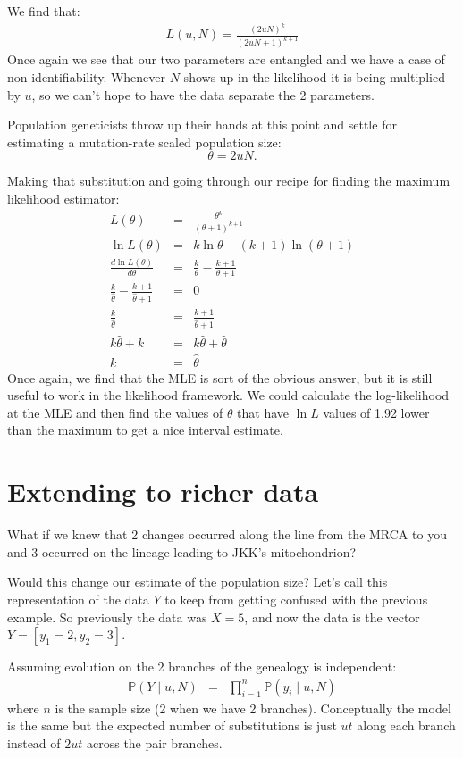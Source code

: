 \documentclass[11pt]{article}
\renewcommand{\Pr}{\mathbb{P}}
\begin{document}
We find that:
\begin{eqnarray}
L(u, N)  = \frac{(2uN)^k}{(2uN + 1)^{k+1}} \label{simplestL}
\end{eqnarray}
Once again we see that our two parameters are entangled and we have a case of non-identifiability.
Whenever $N$ shows up in the likelihood it is being multiplied by $u$, so we can't hope to 
have the data separate the 2 parameters.

Population geneticists throw up their hands at this point and settle for estimating a mutation-rate scaled population size:
$$\theta = 2uN.$$

Making that substitution and going through our recipe for finding the maximum likelihood estimator:
\begin{eqnarray}
L(\theta)  & = & \frac{\theta^k}{(\theta + 1)^{k+1}} \\
\ln L(\theta)  & = & k\ln\theta - (k+1) \ln(\theta + 1) \\
\frac{d\ln L(\theta)}{d\theta} & = & \frac{k}{\theta} - \frac{k + 1}{\theta + 1} \\
\frac{k}{\hat{\theta}} - \frac{k + 1}{\hat{\theta} + 1} & = & 0 \\ 
\frac{k}{\hat{\theta}} & = &  \frac{k + 1}{\hat{\theta} + 1} \\
k\hat{\theta} + k & = & k\hat{\theta} + \hat{\theta} \\
k & = & \hat{\theta}
\end{eqnarray}
Once again, we find that the MLE is sort of the obvious answer, but it is still
useful to work in the likelihood framework.
We could calculate the log-likelihood at the MLE and then find
the values of $\theta$ that have $\ln L$ values of 1.92 lower than the maximum
to get a nice interval estimate.

\section{Extending to richer data}
What if we knew that 2 changes occurred along the line from the MRCA to you and 3 occurred 
on the lineage leading to JKK's mitochondrion?

Would this change our estimate of the population size?
Let's call this representation of the data $Y$ to keep from getting confused with the previous
    example.
So previously the data was $X=5$, and now the data is the vector $Y = [y_1=2, y_2=3]$.

Assuming evolution on the 2 branches of the genealogy is independent:
\begin{eqnarray}
\Pr(Y \mid u, N) & = & \prod_{i=1}^{n} \Pr(y_i \mid u, N)
\end{eqnarray}
where $n$ is the sample size (2 when we have 2 branches).
Conceptually the model is the same but the expected number of substitutions
    is just $ut$ along each branch instead of $2ut$ across the pair branches.
\end{document}

